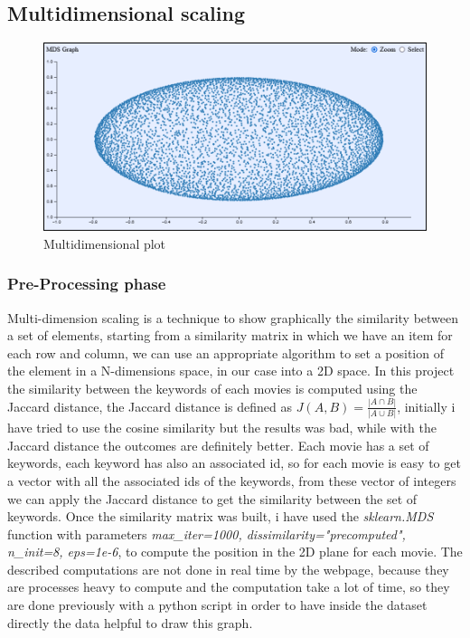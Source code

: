 \documentclass[]{article}
\begin{document}
\subsection{Multidimensional scaling}
\begin{figure}[H]
	\centering
	\includegraphics[width=1\linewidth]{images/mds_plot}
	\caption{Multidimensional plot}
	\label{fig:mdsplot}
\end{figure}
\subsubsection{Pre-Processing phase}
Multi-dimension scaling is a technique to show graphically the similarity between a set of elements, starting from a similarity matrix in which we have an item for each row and column, we can use an appropriate algorithm to set a position of the element in a N-dimensions space, in our case into a 2D space.\newline
In this project the similarity between the keywords of each movies is computed using the Jaccard distance, the Jaccard distance is defined as $J(A,B)=\frac{|A\cap B|}{|A\cup B|}$, initially i have tried to use the cosine similarity but the results was bad, while with the Jaccard distance the outcomes are definitely better.\newline
Each movie has a set of keywords, each keyword has also an associated id, so for each movie is easy to get a vector with all the associated ids of the keywords, from these vector of integers we can apply the Jaccard distance to get the similarity between the set of keywords.\newline
Once the similarity matrix was built, i have used the \emph{sklearn.MDS} function with parameters \emph{max\_iter=1000, dissimilarity="precomputed", n\_init=8, eps=1e-6}, to compute the position in the 2D plane for each movie.\newline
The described computations are not done in real time by the webpage, because they are processes heavy to compute and the computation take a lot of time, so they are done previously with a python script in order to have inside the dataset directly the data helpful to draw this graph.
\end{document}
